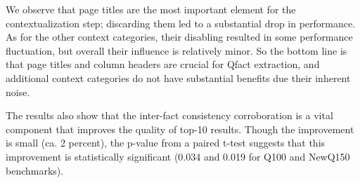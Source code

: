 We observe that page titles 
are the most important element for the contextualization step; discarding them led to a substantial drop in performance. 
As for the other context categories, their disabling resulted
in some performance fluctuation, but overall their influence is
relatively minor.
So the bottom line is that page titles and column headers are crucial for Qfact extraction, and additional context categories do not have substantial benefits due their inherent noise.

The results also show that the inter-fact consistency corroboration is a vital component that improves the quality of top-10 results. Though the improvement is small (ca. 2 percent), the p-value from a paired t-test suggests that this improvement is statistically significant (0.034 and 0.019 for Q100 and NewQ150 benchmarks).



%



